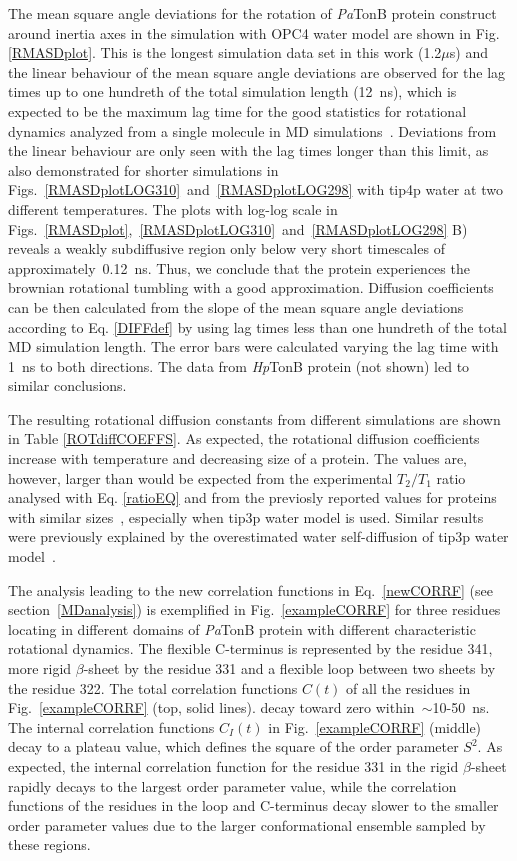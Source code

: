 \documentclass[pre,aps,floatfix,authordate1-4,twocolumn]{revtex4-1}
\begin{document}
The mean square angle deviations for the rotation of {\it Pa}TonB protein construct
around inertia axes in the simulation with OPC4 water model
are shown in Fig. \ref{RMASDplot}. This is the longest
simulation data set in this work (1.2$\mu$s) and the
linear behaviour of the mean square angle deviations are observed
for the lag times up to one hundreth of the total simulation length (12~ns),
which is expected to be the maximum lag time for the good statistics
for rotational dynamics analyzed from a single molecule in MD simulations~\cite{lu06}.
Deviations from the linear behaviour are only seen with the lag times longer
than this limit, as also demonstrated for shorter simulations in
Figs.~\ref{RMASDplotLOG310}~and~\ref{RMASDplotLOG298} with tip4p water at
two different temperatures. The plots with log-log scale in
Figs.~\ref{RMASDplot},~\ref{RMASDplotLOG310}~and~\ref{RMASDplotLOG298} B)
reveals a weakly subdiffusive region only below very short timescales
of approximately~0.12~ns. Thus, we conclude that the protein
experiences the brownian rotational tumbling with  a good approximation.
Diffusion coefficients can be then calculated from the slope of the mean square angle
deviations according to Eq. \ref{DIFFdef} by using lag times less than
one hundreth of the total MD simulation length.
The error bars were calculated varying the lag time with 1~ns to both directions.
The data from {\it Hp}TonB protein (not shown) led to similar conclusions.

The resulting rotational diffusion constants from different simulations are
shown in Table \ref{ROTdiffCOEFFS}.
As expected, the rotational diffusion coefficients
increase with temperature and decreasing size of a protein.
The values are, however, larger than would be  
expected from the experimental $T_2/T_1$ ratio analysed with Eq. \ref{ratioEQ}
and from the previosly reported values for proteins with similar
sizes~\cite{krishnan98}, especially when tip3p water model is used.
Similar results were previously explained by the overestimated water
self-diffusion of tip3p water model~\cite{wong08}.

The analysis leading to the new correlation functions in Eq.~\ref{newCORRF}
(see section~\ref{MDanalysis}) is exemplified in
Fig.~\ref{exampleCORRF} for three residues locating in different domains of {\it Pa}TonB
protein with different characteristic rotational dynamics.
The flexible C-terminus is represented by the residue 341,
more rigid $\beta$-sheet by the residue 331 and a
flexible loop between two sheets by the residue 322. 
The total correlation functions $C(t)$
of all the residues in Fig.~\ref{exampleCORRF}  (top, solid lines). 
decay toward zero within~$\sim$10-50~ns.
The internal correlation functions $C_I(t)$ in Fig.~\ref{exampleCORRF} (middle)
decay to a plateau value, which defines the square of the order parameter $S^2$.
As expected, the internal correlation function for the residue 331 in the
rigid $\beta$-sheet rapidly decays to the largest order parameter value,
while the correlation functions of the residues in the loop and C-terminus 
decay slower to the smaller order parameter values due to the larger conformational ensemble
sampled by these regions.
\end{document}
